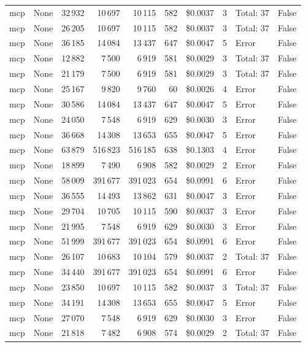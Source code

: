\documentclass[a4paper,11pt]{article}
\begin{document}
\begin{table}[H]
{\begin{tabular}{l r r r r r r r l r}
mcp & None & 32\,932 & 10\,697 & 10\,115 & 582 & \$0.0037 & 3 & Total: 37 & False \\
mcp & None & 26\,205 & 10\,697 & 10\,115 & 582 & \$0.0037 & 3 & Total: 37 & False \\
mcp & None & 36\,185 & 14\,084 & 13\,437 & 647 & \$0.0047 & 5 & Error & False \\
mcp & None & 12\,882 & 7\,500 & 6\,919 & 581 & \$0.0029 & 3 & Total: 37 & False \\
mcp & None & 21\,179 & 7\,500 & 6\,919 & 581 & \$0.0029 & 3 & Total: 37 & False \\
mcp & None & 25\,167 & 9\,820 & 9\,760 & 60 & \$0.0026 & 4 & Error & False \\
mcp & None & 30\,586 & 14\,084 & 13\,437 & 647 & \$0.0047 & 5 & Error & False \\
mcp & None & 24\,050 & 7\,548 & 6\,919 & 629 & \$0.0030 & 3 & Error & False \\
mcp & None & 36\,668 & 14\,308 & 13\,653 & 655 & \$0.0047 & 5 & Error & False \\
mcp & None & 63\,879 & 516\,823 & 516\,185 & 638 & \$0.1303 & 4 & Error & False \\
mcp & None & 18\,899 & 7\,490 & 6\,908 & 582 & \$0.0029 & 2 & Error & False \\
mcp & None & 58\,009 & 391\,677 & 391\,023 & 654 & \$0.0991 & 6 & Error & False \\
mcp & None & 36\,555 & 14\,493 & 13\,862 & 631 & \$0.0047 & 3 & Error & False \\
mcp & None & 29\,704 & 10\,705 & 10\,115 & 590 & \$0.0037 & 3 & Error & False \\
mcp & None & 21\,995 & 7\,548 & 6\,919 & 629 & \$0.0030 & 3 & Error & False \\
mcp & None & 51\,999 & 391\,677 & 391\,023 & 654 & \$0.0991 & 6 & Error & False \\
mcp & None & 26\,107 & 10\,683 & 10\,104 & 579 & \$0.0037 & 2 & Total: 37 & False \\
mcp & None & 34\,440 & 391\,677 & 391\,023 & 654 & \$0.0991 & 6 & Error & False \\
mcp & None & 23\,850 & 10\,697 & 10\,115 & 582 & \$0.0037 & 3 & Total: 37 & False \\
mcp & None & 34\,191 & 14\,308 & 13\,653 & 655 & \$0.0047 & 5 & Error & False \\
mcp & None & 27\,070 & 7\,548 & 6\,919 & 629 & \$0.0030 & 3 & Error & False \\
mcp & None & 21\,818 & 7\,482 & 6\,908 & 574 & \$0.0029 & 2 & Total: 37 & False \\

\end{tabular}}
\end{table}
\end{document}
